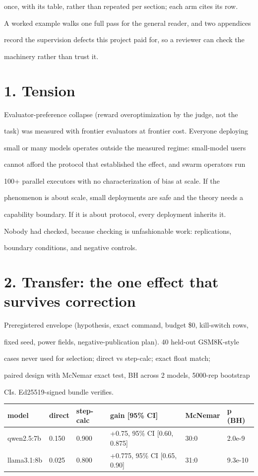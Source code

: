 \documentclass[11pt]{article}
\begin{document}
once, with its table, rather than repeated per section; each arm cites its row.

A worked example walks one full pass for the general reader, and two appendices

record the supervision defects this project paid for, so a reviewer can check the

machinery rather than trust it.


\section*{1. Tension}

Evaluator-preference collapse (reward overoptimization by the judge, not the

task) was measured with frontier evaluators at frontier cost. Everyone deploying

small or many models operates outside the measured regime: small-model users

cannot afford the protocol that established the effect, and swarm operators run

100+ parallel executors with no characterization of bias at scale. If the

phenomenon is about scale, small deployments are safe and the theory needs a

capability boundary. If it is about protocol, every deployment inherits it.

Nobody had checked, because checking is unfashionable work: replications,

boundary conditions, and negative controls.


\section*{2. Transfer: the one effect that survives correction}

Preregistered envelope (hypothesis, exact command, budget \$0, kill-switch rows,

fixed seed, power fields, negative-publication plan). 40 held-out GSM8K-style

cases never used for selection; direct vs step-calc; exact float match;

paired design with McNemar exact test, BH across 2 models, 5000-rep bootstrap

CIs. Ed25519-signed bundle verifies.


\begin{center}\small\begin{tabular}{llllll}\hline
model & direct & step-calc & gain [95\% CI] & McNemar & p (BH) \\
\hline
qwen2.5:7b & 0.150 & 0.900 & +0.75, 95\% CI [0.60, 0.875] & 30:0 & 2.0e-9 \\
llama3.1:8b & 0.025 & 0.800 & +0.775, 95\% CI [0.65, 0.90] & 31:0 & 9.3e-10 \\
\end{tabular}\end{center}
\end{document}
